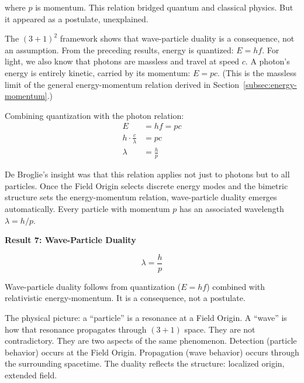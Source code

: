 \documentclass[aps,prd,preprint,superscriptaddress,showpacs,preprintnumbers,amsmath,amssymb,nofootinbib]{revtex4-2}
\begin{document}
where $p$ is momentum. This relation bridged quantum and classical physics. But it appeared as a postulate, unexplained.

The $(3+1)^2$ framework shows that wave-particle duality is a consequence, not an assumption. From the preceding results, energy is quantized: $E = hf$. For light, we also know that photons are massless and travel at speed $c$. A photon's energy is entirely kinetic, carried by its momentum: $E = pc$. (This is the massless limit of the general energy-momentum relation derived in Section~\ref{subsec:energy-momentum}.)

Combining quantization with the photon relation:
\begin{align}
E &= hf = pc \\
h \cdot \frac{c}{\lambda} &= pc \\
\lambda &= \frac{h}{p}
\end{align}

De Broglie's insight was that this relation applies not just to photons but to all particles. Once the Field Origin selects discrete energy modes and the bimetric structure sets the energy-momentum relation, wave-particle duality emerges automatically. Every particle with momentum $p$ has an associated wavelength $\lambda = h/p$.

\vspace{1.5em}
\noindent
\colorbox{resultgreen}{\parbox{\dimexpr\textwidth-2\fboxsep\relax}{%
\vspace{0.8em}
\centering
\textbf{\large Result 7: Wave-Particle Duality}

\vspace{0.5em}
\boldmath
\begin{equation}
\lambda = \frac{h}{p}
\end{equation}
\unboldmath

\vspace{0.3em}
Wave-particle duality follows from quantization ($E = hf$) combined with relativistic energy-momentum. It is a consequence, not a postulate.
\vspace{0.5em}
}}
\vspace{1cm}

The physical picture: a ``particle'' is a resonance at a Field Origin. A ``wave'' is how that resonance propagates through $(3+1)$ space. They are not contradictory. They are two aspects of the same phenomenon. Detection (particle behavior) occurs at the Field Origin. Propagation (wave behavior) occurs through the surrounding spacetime. The duality reflects the structure: localized origin, extended field.
\end{document}
